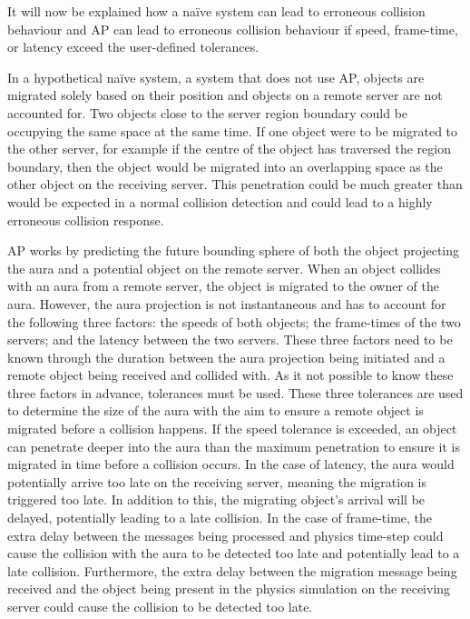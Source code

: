 It will now be explained how a naïve system can lead to erroneous collision behaviour and AP can lead to erroneous collision behaviour if speed, frame-time, or latency exceed the user-defined tolerances. 

In a hypothetical naïve system, a system that does not use AP, objects are migrated solely based on their position and objects on a remote server are not accounted for. Two objects close to the server region boundary could be occupying the same space at the same time. If one object were to be migrated to the other server, for example if the centre of the object has traversed the region boundary, then the object would be migrated into an overlapping space as the other object on the receiving server. This penetration could be much greater than would be expected in a normal collision detection and could lead to a highly erroneous collision response.

AP works by predicting the future bounding sphere of both the object projecting the aura and a potential object on the remote server. When an object collides with an aura from a remote server, the object is migrated to the owner of the aura. However, the aura projection is not instantaneous and has to account for the following three factors: the speeds of both objects; the frame-times of the two servers; and the latency between the two servers. These three factors need to be known through the duration between the aura projection being initiated and a remote object being received and collided with. As it not possible to know these three factors in advance, tolerances must be used. These three tolerances are used to determine the size of the aura with the aim to ensure a remote object is migrated before a collision happens. If the speed tolerance is exceeded, an object can penetrate deeper into the aura than the maximum penetration to ensure it is migrated in time before a collision occurs. In the case of latency, the aura would potentially arrive too late on the receiving server, meaning the migration is triggered too late. In addition to this, the migrating object's arrival will be delayed, potentially leading to a late collision. In the case of frame-time, the extra delay between the messages being processed and physics time-step could cause the collision with the aura to be detected too late and potentially lead to a late collision. Furthermore, the extra delay between the migration message being received and the object being present in the physics simulation on the receiving server could cause the collision to be detected too late.


